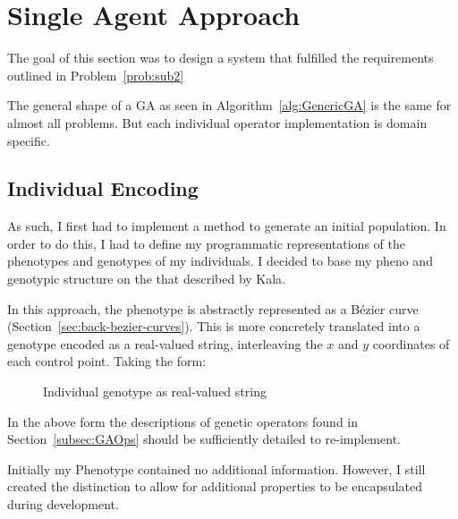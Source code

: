 
\section{Single Agent Approach}

The goal of this section was to design a system that fulfilled the requirements outlined in Problem~\ref{prob:sub2}

The general shape of a GA as seen in Algorithm~\ref{alg:GenericGA} is the same for almost all problems. But each individual operator implementation is domain specific.

\subsection{Individual Encoding}
As such, I first had to implement a method to generate an initial population. In order to do this, I had to define my programmatic representations of the phenotypes and genotypes of my individuals. I decided to base my pheno and genotypic structure on the that described by Kala\cite{kalaOnroadIntelligentVehicles2016}.

In this approach, the phenotype is abstractly represented as a Bézier curve (Section~\ref{sec:back-bezier-curves}). This is more concretely translated into a genotype encoded as a real-valued string, interleaving the $x$ and $y$ coordinates of each control point. Taking the form:

\begin{figure}[ht]
	\centering
	\caption{\label{fig:GA_Genotype} Individual genotype as real-valued string }
\end{figure}

In the above form the descriptions of genetic operators found in Section~\ref{subsec:GAOps} should be sufficiently detailed to re-implement.

Initially my Phenotype contained no additional information. However, I still created the distinction to allow for additional properties to be encapsulated during development.

